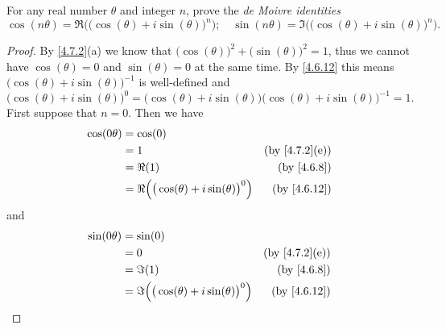 \begin{ex}\label{ex:4.7.7}
  For any real number \(\theta\) and integer \(n\), prove the \emph{de Moivre identities}
  \[
    \cos(n \theta) = \Re\Big(\big(\cos(\theta) + i \sin(\theta)\big)^n\Big); \quad \sin(n \theta) = \Im\Big(\big(\cos(\theta) + i \sin(\theta)\big)^n\Big).
  \]
\end{ex}

\begin{proof}
  By \cref{4.7.2}(a) we know that \(\big(\cos(\theta)\big)^2 + \big(\sin(\theta)\big)^2 = 1\), thus we cannot have \(\cos(\theta) = 0\) and \(\sin(\theta) = 0\) at the same time.
  By \cref{4.6.12} this means \(\big(\cos(\theta) + i \sin(\theta)\big)^{-1}\) is well-defined and
  \[
    \big(\cos(\theta) + i \sin(\theta)\big)^0 = \big(\cos(\theta) + i \sin(\theta)\big) \big(\cos(\theta) + i \sin(\theta)\big)^{-1} = 1.
  \]
  First suppose that \(n = 0\).
  Then we have
  \begin{align*}
    \cos(0 \theta) & = \cos(0)                                                                              \\
                   & = 1                                                      & \text{(by \cref{4.7.2}(e))} \\
                   & = \Re(1)                                                 & \text{(by \cref{4.6.8})}    \\
                   & = \Re\Big(\big(\cos(\theta) + i \sin(\theta)\big)^0\Big) & \text{(by \cref{4.6.12})}
  \end{align*}
  and
  \begin{align*}
    \sin(0 \theta) & = \sin(0)                                                                              \\
                   & = 0                                                      & \text{(by \cref{4.7.2}(e))} \\
                   & = \Im(1)                                                 & \text{(by \cref{4.6.8})}    \\
                   & = \Im\Big(\big(\cos(\theta) + i \sin(\theta)\big)^0\Big) & \text{(by \cref{4.6.12})}
  \end{align*}


\end{proof}
